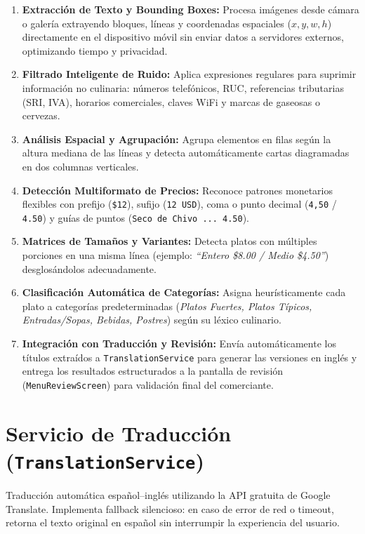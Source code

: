 \documentclass[11pt, a4paper, oneside]{report}
\begin{document}
\begin{enumerate}
  \item \textbf{Extracción de Texto y Bounding Boxes:} Procesa imágenes desde cámara o galería extrayendo bloques, líneas y coordenadas espaciales ($x, y, w, h$) directamente en el dispositivo móvil sin enviar datos a servidores externos, optimizando tiempo y privacidad.
  \item \textbf{Filtrado Inteligente de Ruido:} Aplica expresiones regulares para suprimir información no culinaria: números telefónicos, RUC, referencias tributarias (SRI, IVA), horarios comerciales, claves WiFi y marcas de gaseosas o cervezas.
  \item \textbf{Análisis Espacial y Agrupación:} Agrupa elementos en filas según la altura mediana de las líneas y detecta automáticamente cartas diagramadas en dos columnas verticales.
  \item \textbf{Detección Multiformato de Precios:} Reconoce patrones monetarios flexibles con prefijo (\texttt{\$12}), sufijo (\texttt{12 USD}), coma o punto decimal (\texttt{4,50} / \texttt{4.50}) y guías de puntos (\texttt{Seco de Chivo ... 4.50}).
  \item \textbf{Matrices de Tamaños y Variantes:} Detecta platos con múltiples porciones en una misma línea (ejemplo: \textit{``Entero \$8.00 / Medio \$4.50''}) desglosándolos adecuadamente.
  \item \textbf{Clasificación Automática de Categorías:} Asigna heurísticamente cada plato a categorías predeterminadas (\textit{Platos Fuertes, Platos Típicos, Entradas/Sopas, Bebidas, Postres}) según su léxico culinario.
  \item \textbf{Integración con Traducción y Revisión:} Envía automáticamente los títulos extraídos a \texttt{TranslationService} para generar las versiones en inglés y entrega los resultados estructurados a la pantalla de revisión (\texttt{MenuReviewScreen}) para validación final del comerciante.
\end{enumerate}

\section{Servicio de Traducción (\texttt{TranslationService})}

Traducción automática español--inglés utilizando la API gratuita de Google Translate. Implementa fallback silencioso: en caso de error de red o timeout, retorna el texto original en español sin interrumpir la experiencia del usuario.
\end{document}
